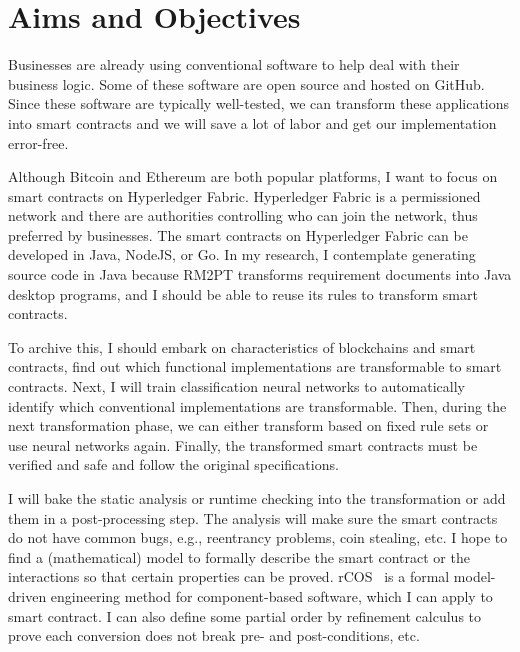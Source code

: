 





\section{Aims and Objectives}

Businesses are already using conventional software to help deal with their business logic.
Some of these software are open source and hosted on GitHub.
Since these software are typically well-tested, we can transform these applications into smart contracts and we will save a lot of labor and get our implementation error-free.

Although Bitcoin and Ethereum are both popular platforms, I want to focus on smart contracts on Hyperledger Fabric.
Hyperledger Fabric is a permissioned network and there are authorities controlling who can join the network, thus preferred by businesses.
The smart contracts on Hyperledger Fabric can be developed in Java, NodeJS, or Go.
In my research, I contemplate generating source code in Java because RM2PT transforms requirement documents into Java desktop programs,
and I should be able to reuse its rules to transform smart contracts.

To archive this, I should embark on characteristics of blockchains and smart contracts, find out which functional implementations are transformable to smart contracts.
Next, I will train classification neural networks to automatically identify which conventional implementations are transformable.
Then, during the next transformation phase, we can either transform based on fixed rule sets or use neural networks again.
Finally, the transformed smart contracts must be verified and safe and follow the original specifications.

I will bake the static analysis or runtime checking into the transformation or add them in a post-processing step.
The analysis will make sure the smart contracts do not have common bugs, e.g., reentrancy problems, coin stealing, etc.
I hope to find a (mathematical) model to formally describe the smart contract or the interactions so that certain properties can be proved.
rCOS~\cite{ke2012rcos} is a formal model-driven engineering method for component-based software, which I can apply to smart contract.
I can also define some partial order by refinement calculus to prove each conversion does not break pre- and post-conditions, etc.





